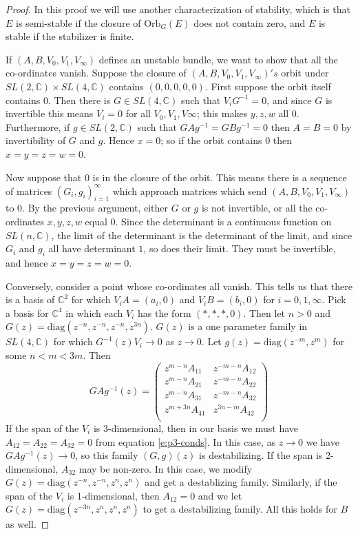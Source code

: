 \documentclass[]{article}
\newcommand{\C}{\mathbb{C}}
\begin{document}
	\begin{proof}
		In this proof we will use another characterization of stability, which is that $E$ is semi-stable if the closure of $\text{Orb}_G(E)$ does not contain zero, and $E$ is stable if the stabilizer is finite. 
		
		If $(A,B,V_0,V_1,V_\infty)$ defines an unstable bundle, we want to show that all the co-ordinates vanish. Suppose the closure of $(A,B,V_0,V_1,V_\infty)'s$ orbit under $SL(2,\C)\times SL(4,\C)$ contains $(0,0,0,0,0)$. First suppose the orbit itself contains $0$. Then there is $G\in SL(4,\C)$ such that $V_i G^{-1} =0$, and since $G$ is invertible this means $V_i = 0$ for all $V_0,V_1,V\infty$; this makes $y,z,w$ all 0. Furthermore, if $g\in SL(2,\C)$ such that $GAg^{-1} = GBg^{-1} =0$ then $A=B=0$ by invertibility of $G$ and $g$. Hence $x=0$; so if the orbit contains $0$ then $x=y=z=w=0$. 
		
		Now suppose that $0$ is in the closure of the orbit. This means there is a sequence of matrices $(G_i,g_i)_{i=1}^\infty$ which approach matrices which send $(A,B,V_0,V_1,V_\infty)$ to $0$. By the previous argument, either $G$ or $g$ is not invertible, or all the co-ordinates $x,y,z,w$ equal 0. Since the determinant is a continuous function on $SL(n,\C)$, the limit of the determinant is the determinant of the limit, and since $G_i$ and $g_i$ all have determinant $1$, so does their limit. They must be invertible, and hence $x=y=z=w=0$.\vspace{1em}
		
		
		Conversely, consider a point whose co-ordinates all vanish. This tells us that there is a basis of $\C^2$ for which $V_i A = (a_i,0)$ and $V_i B = (b_i ,0)$ for $i=0,1,\infty$. Pick a basis for $\C^4$ in which each $V_i$ has the form $(\ast,\ast,\ast,0)$. Then let $n>0$ and $G(z) = \text{diag}(z^{-n}, z^{-n}, z^{-n}, z^{3n})$. $G(z)$ is a one parameter family in $SL(4,\C)$ for which $G^{-1}(z)V_i \to 0$ as $z\to 0$. Let $g(z) = \text{diag}(z^{-m}, z^{m})$ for some $n < m < 3m$. Then
		\begin{equation}
			GAg^{-1}(z) =
			\begin{pmatrix}
			z^{m-n} A_{11} & z^{-m-n}A_{12}\\
			z^{m-n} A_{21} & z^{-m-n}A_{22}\\
			z^{m-n} A_{31} & z^{-m-n}A_{32}\\
			z^{m+3n} A_{41} & z^{3n-m}A_{42}\\
			\end{pmatrix} 
		\end{equation}
		If the span of the $V_i$ is 3-dimensional, then in our basis we must have $A_{12}=A_{22}=A_{32}=0$ from equation \ref{e:p3-conds}. In this case, as $z\to 0$ we have $GAg^{-1}(z) \to 0$, so this family $(G,g)(z)$ is destabilizing. If the span is 2-dimensional, $A_{32}$ may be non-zero. In this case, we modify $G(z) = \text{diag}(z^{-n}, z^{-n}, z^n, z^n)$ and get a destablizing family. Similarly, if the span of the $V_i$ is 1-dimensional, then $A_{12}=0$ and we let $G(z) = \text{diag}(z^{-3n}, z^n, z^n, z^n)$ to get a destabilizing family. All this holds for $B$ as well.
		

\end{proof}
\end{document}
